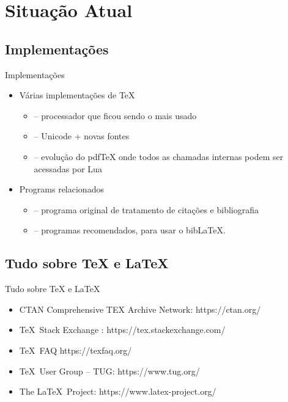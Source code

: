 \documentclass{beamer}
\begin{document}
\section{Situação Atual}

\subsection{Implementações}
\begin{frame}{Implementações}
\begin{itemize}
    \item Várias implementações de \TeX
    \begin{itemize}
        \item {} – processador que ficou sendo o mais usado
        \item {} – Unicode + novas fontes
        \item {} – evolução do pdfTeX onde todos as chamadas internas podem ser acessadas por Lua 
    \end{itemize}
    \item Programs relacionados
    \begin{itemize}
        \item {} – programa original de tratamento de citações e bibliografia
        \item {} – programas recomendados, para usar o bib\LaTeX.
        
    \end{itemize}
\end{itemize}
\end{frame}

\subsection{Tudo sobre \TeX{} e \LaTeX}
\begin{frame}{Tudo sobre \TeX{} e \LaTeX}
    \begin{itemize}
        \item CTAN Comprehensive TEX Archive Network: https://ctan.org/
        \item \TeX\ Stack Exchange :  https://tex.stackexchange.com/
        \item \TeX\ FAQ https://texfaq.org/
        \item \TeX\ User Group – TUG: https://www.tug.org/
        \item The \LaTeX\ Project: https://www.latex-project.org/
    \end{itemize}
\end{frame}
\end{document}
